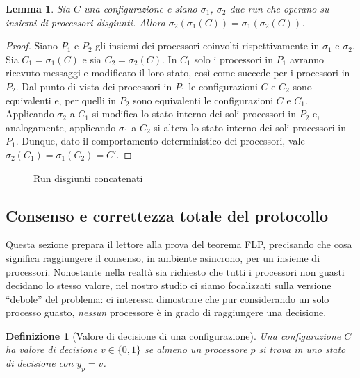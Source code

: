 \documentclass{article}
\newtheorem{definizione}{Definizione}
\newtheorem{lemma}{Lemma}
\begin{document}
\begin{lemma}
  Sia $C$ una configurazione e siano $\sigma_1$, $\sigma_2$ due run
  che operano su insiemi di processori disgiunti. Allora
  $\sigma_2(\sigma_1(C))=\sigma_1(\sigma_2(C))$.
\end{lemma}

\begin{proof}
  Siano $P_1$ e $P_2$ gli insiemi dei processori coinvolti
  rispettivamente in $\sigma_1$ e $\sigma_2$. Sia $C_1=\sigma_1(C)$ e
  sia $C_2=\sigma_2(C)$. In $C_1$ solo i processori in $P_1$ avranno
  ricevuto messaggi e modificato il loro stato, così come succede per
  i processori in $P_2$. Dal punto di vista dei processori in $P_1$ le
  configurazioni $C$ e $C_2$ sono equivalenti e, per quelli in $P_2$
  sono equivalenti le configurazioni $C$ e $C_1$. Applicando
  $\sigma_2$ a $C_1$ si modifica lo stato interno dei soli processori
  in $P_2$ e, analogamente, applicando $\sigma_1$ a $C_2$ si altera lo
  stato interno dei soli processori in $P_1$. Dunque, dato il
  comportamento deterministico dei processori, vale
  $\sigma_2(C_1)=\sigma_1(C_2)=C'$.
\end{proof}

\begin{figure}[!h]
  \centering \caption{Run
    disgiunti concatenati}\label{fig:concatenazioneSchedule}
\end{figure}

\subsection{Consenso e correttezza totale del protocollo}

Questa sezione prepara il lettore alla prova del teorema FLP,
precisando che cosa significa raggiungere il consenso, in ambiente
asincrono, per un insieme di processori. Nonostante nella realt\`a sia
richiesto che tutti i processori non guasti decidano lo stesso valore,
nel nostro studio ci siamo focalizzati sulla versione ``debole'' del
problema: ci interessa dimostrare che pur considerando un solo
processo guasto, \emph{nessun} processore \`e in grado di raggiungere
una decisione.

\begin{definizione}[Valore di decisione di una configurazione]
  Una configurazione $C$ ha valore di decisione $v \in \{0,1\}$ se
  almeno un processore $p$ si trova in uno stato di decisione con
  $y_p=v$.
\end{definizione}
\end{document}

